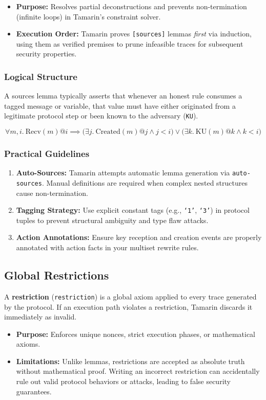 \documentclass[11pt,a4paper]{article}
\begin{document}
\begin{itemize}
    \item \textbf{Purpose:} Resolves partial deconstructions and prevents non-termination (infinite loops) in Tamarin's constraint solver.
    \item \textbf{Execution Order:} Tamarin proves \texttt{[sources]} lemmas \emph{first} via induction, using them as verified premises to prune infeasible traces for subsequent security properties.
\end{itemize}

\subsubsection{Logical Structure}
A sources lemma typically asserts that whenever an honest rule consumes a tagged message or variable, that value must have either originated from a legitimate protocol step or been known to the adversary (\texttt{KU}).

\begin{equation*}
\forall m, i.\ \text{Recv}(m) @ i \implies \big(\exists j.\ \text{Created}(m) @ j \land j < i\big) \lor \big(\exists k.\ \text{KU}(m) @ k \land k < i\big)
\end{equation*}

\subsubsection{Practical Guidelines}
\begin{enumerate}
    \item \textbf{Auto-Sources:} Tamarin attempts automatic lemma generation via \texttt{auto-sources}. Manual definitions are required when complex nested structures cause non-termination.
    \item \textbf{Tagging Strategy:} Use explicit constant tags (e.g., \texttt{`1'}, \texttt{`3'}) in protocol tuples to prevent structural ambiguity and type flaw attacks.
    \item \textbf{Action Annotations:} Ensure key reception and creation events are properly annotated with action facts in your multiset rewrite rules.
\end{enumerate}

\subsection{Global Restrictions}

A \textbf{restriction} (\texttt{restriction}) is a global axiom applied to every trace generated by the protocol. If an execution path violates a restriction, Tamarin discards it immediately as invalid.

\begin{itemize}
    \item \textbf{Purpose:} Enforces unique nonces, strict execution phases, or mathematical axioms.
    \item \textbf{Limitations:} Unlike lemmas, restrictions are accepted as absolute truth without mathematical proof. Writing an incorrect restriction can accidentally rule out valid protocol behaviors or attacks, leading to false security guarantees.
\end{itemize}
\end{document}
